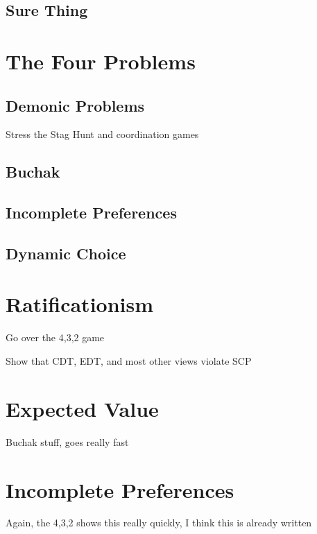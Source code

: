 \documentclass[
  10pt,
  letterpaper,
  DIV=11,
  numbers=noendperiod,
  twoside]{scrartcl}
\begin{document}
\subsection{Sure Thing}\label{sure-thing}

\section{The Four Problems}\label{the-four-problems}

\subsection{Demonic Problems}\label{demonic-problems}

Stress the Stag Hunt and coordination games

\subsection{Buchak}\label{sec-buchak}

\subsection{Incomplete Preferences}\label{incomplete-preferences}

\subsection{Dynamic Choice}\label{dynamic-choice}

\section{Ratificationism}\label{ratificationism}

Go over the 4,3,2 game

Show that CDT, EDT, and most other views violate SCP

\section{Expected Value}\label{expected-value}

Buchak stuff, goes really fast

\section{Incomplete Preferences}\label{incomplete-preferences-1}

Again, the 4,3,2 shows this really quickly, I think this is already
written
\end{document}
